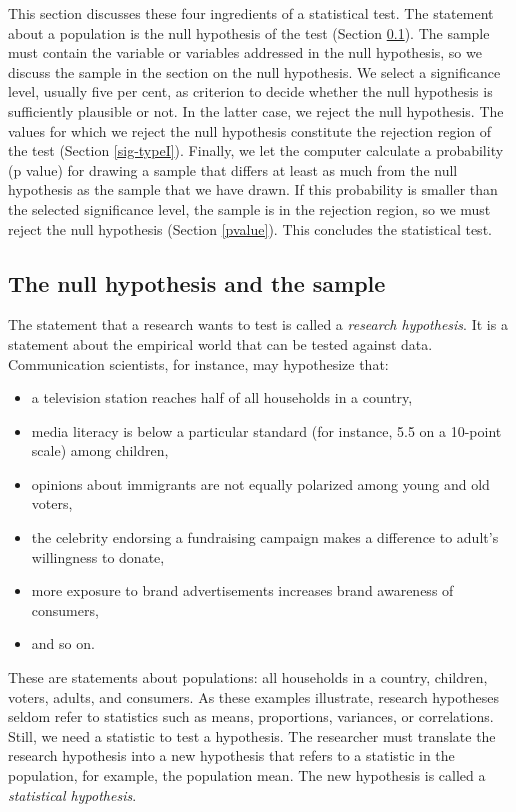 \documentclass[a4paper]{book}
\theoremstyle{definition}
\theoremstyle{definition}
\theoremstyle{definition}
\theoremstyle{remark}
\begin{document}
This section discusses these four ingredients of a statistical test. The
statement about a population is the null hypothesis of the test (Section
\ref{nullhypothesis}). The sample must contain the variable or variables
addressed in the null hypothesis, so we discuss the sample in the
section on the null hypothesis. We select a significance level, usually
five per cent, as criterion to decide whether the null hypothesis is
sufficiently plausible or not. In the latter case, we reject the null
hypothesis. The values for which we reject the null hypothesis
constitute the rejection region of the test (Section \ref{sig-typeI}).
Finally, we let the computer calculate a probability (p value) for
drawing a sample that differs at least as much from the null hypothesis
as the sample that we have drawn. If this probability is smaller than
the selected significance level, the sample is in the rejection region,
so we must reject the null hypothesis (Section \ref{pvalue}). This
concludes the statistical test.

\subsection{The null hypothesis and the sample}\label{nullhypothesis}

The statement that a research wants to test is called a \emph{research
hypothesis}. It is a statement about the empirical world that can be
tested against data. Communication scientists, for instance, may
hypothesize that:

\begin{itemize}
\item
  a television station reaches half of all households in a country,
\item
  media literacy is below a particular standard (for instance, 5.5 on a
  10-point scale) among children,
\item
  opinions about immigrants are not equally polarized among young and
  old voters,
\item
  the celebrity endorsing a fundraising campaign makes a difference to
  adult's willingness to donate,
\item
  more exposure to brand advertisements increases brand awareness of
  consumers,
\item
  and so on.
\end{itemize}

These are statements about populations: all households in a country,
children, voters, adults, and consumers. As these examples illustrate,
research hypotheses seldom refer to statistics such as means,
proportions, variances, or correlations. Still, we need a statistic to
test a hypothesis. The researcher must translate the research hypothesis
into a new hypothesis that refers to a statistic in the population, for
example, the population mean. The new hypothesis is called a
\emph{statistical hypothesis}.
\end{document}
